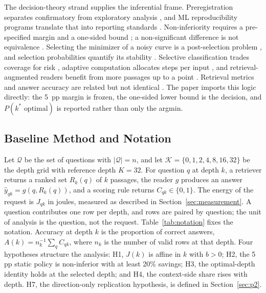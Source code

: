 \documentclass[a4paper,fleqn]{cas-sc}
\begin{document}
The decision-theory strand supplies the inferential frame. Preregistration separates confirmatory from exploratory analysis \cite{nosek2018,chambers2022registered}, and ML reproducibility programs translate that into reporting standards \cite{pineau2021reproducibility}. Non-inferiority requires a pre-specified margin and a one-sided bound \cite{piaggio2006}; a non-significant difference is not equivalence \cite{schumi2011noninferiority}. Selecting the minimizer of a noisy curve is a post-selection problem \cite{lee2016postselection}, and selection probabilities quantify its stability \cite{meinshausen2010stability,ioannidis2008winner}. Selective classification trades coverage for risk \cite{geifman2017selective}, adaptive computation allocates steps per input \cite{schuster2022calm}, and retrieval-augmented readers benefit from more passages up to a point \cite{izacard2021fid}. Retrieval metrics and answer accuracy are related but not identical \cite{salemi2024evaluating}. The paper imports this logic directly: the 5~pp margin is frozen, the one-sided lower bound is the decision, and $P(k^{*}\text{ optimal})$ is reported rather than only the argmin.

\subsection{Baseline Method and Notation}\label{sec:baseline}\label{sec:prelim}

Let $\mathcal{Q}$ be the set of questions with $|\mathcal{Q}|=n$, and let $\mathcal{K}=\{0,1,2,4,8,16,32\}$ be the depth grid with reference depth $K=32$. For question $q$ at depth $k$, a retriever returns a ranked set $R_{k}(q)$ of $k$ passages, the reader $g$ produces an answer $\hat y_{qk}=g(q,R_{k}(q))$, and a scoring rule returns $C_{qk}\in\{0,1\}$. The energy of the request is $J_{qk}$ in joules, measured as described in Section~\ref{sec:measurement}. A question contributes one row per depth, and rows are paired by question; the unit of analysis is the question, not the request. Table~\ref{tab:notation} fixes the notation. Accuracy at depth $k$ is the proportion of correct answers, $A(k)=n_{k}^{-1}\sum_{q}C_{qk}$, where $n_{k}$ is the number of valid rows at that depth. Four hypotheses structure the analysis: H1, $J(k)$ is affine in $k$ with $b>0$; H2, the 5 pp static policy is non-inferior with at least 20\% savings; H3, the optimal-depth identity holds at the selected depth; and H4, the context-side share rises with depth. H7, the direction-only replication hypothesis, is defined in Section~\ref{sec:p2}.
\end{document}
